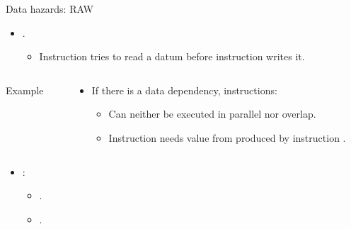 \begin{frame}[t,fragile]{Data hazards: RAW}
\begin{itemize}
  \item {}.
    \begin{itemize}
      \item Instruction  tries to read a datum
            before instruction  writes it.
    \end{itemize}
\end{itemize}
\begin{columns}
\begin{column}{.25\textwidth}
\begin{block}{Example}

\end{block}
\end{column}
\begin{column}{.75\textwidth}
\begin{itemize}
  \item If there is a data dependency, instructions:
    \begin{itemize}
      \item Can neither be executed in parallel nor overlap.
      \item Instruction  needs value from 
            produced by instruction .
    \end{itemize}
\end{itemize}
\end{column}
\end{columns}
\begin{itemize}
  \item {}:
  \begin{itemize}
    \item {}.
    \item {}.
  \end{itemize}
\end{itemize}
\end{frame}

